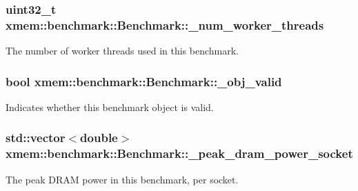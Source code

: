 \subsubsection[{\+\_\+num\+\_\+worker\+\_\+threads}]{\setlength{\rightskip}{0pt plus 5cm}uint32\+\_\+t xmem\+::benchmark\+::\+Benchmark\+::\+\_\+num\+\_\+worker\+\_\+threads\hspace{0.3cm}{\ttfamily [protected]}}\label{classxmem_1_1benchmark_1_1_benchmark_acb55cafc77a1b53ea9910d1be4306970}
The number of worker threads used in this benchmark. \hypertarget{classxmem_1_1benchmark_1_1_benchmark_a87e133558776380738354191ec5e6560}{}
\subsubsection[{\+\_\+obj\+\_\+valid}]{\setlength{\rightskip}{0pt plus 5cm}bool xmem\+::benchmark\+::\+Benchmark\+::\+\_\+obj\+\_\+valid\hspace{0.3cm}{\ttfamily [protected]}}\label{classxmem_1_1benchmark_1_1_benchmark_a87e133558776380738354191ec5e6560}
Indicates whether this benchmark object is valid. \hypertarget{classxmem_1_1benchmark_1_1_benchmark_a4da600693ba1df4fb69c1304b23b2cde}{}
\subsubsection[{\+\_\+peak\+\_\+dram\+\_\+power\+\_\+socket}]{\setlength{\rightskip}{0pt plus 5cm}std\+::vector$<$double$>$ xmem\+::benchmark\+::\+Benchmark\+::\+\_\+peak\+\_\+dram\+\_\+power\+\_\+socket\hspace{0.3cm}{\ttfamily [protected]}}\label{classxmem_1_1benchmark_1_1_benchmark_a4da600693ba1df4fb69c1304b23b2cde}
The peak D\+R\+A\+M power in this benchmark, per socket. \hypertarget{classxmem_1_1benchmark_1_1_benchmark_a673c700cb58ec0bc922f36d95dab12c9}{}
